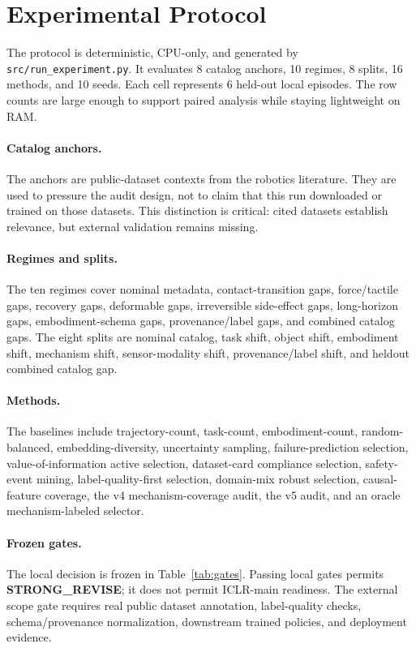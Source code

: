 \documentclass{article}
\begin{document}
\section{Experimental Protocol}
The protocol is deterministic, CPU-only, and generated by \texttt{src/run\_experiment.py}. It evaluates 8 catalog anchors, 10 regimes, 8 splits, 16 methods, and 10 seeds. Each cell represents 6 held-out local episodes. The row counts are large enough to support paired analysis while staying lightweight on RAM.



\paragraph{Catalog anchors.}
The anchors are public-dataset contexts from the robotics literature. They are used to pressure the audit design, not to claim that this run downloaded or trained on those datasets. This distinction is critical: cited datasets establish relevance, but external validation remains missing.

\paragraph{Regimes and splits.}
The ten regimes cover nominal metadata, contact-transition gaps, force/tactile gaps, recovery gaps, deformable gaps, irreversible side-effect gaps, long-horizon gaps, embodiment-schema gaps, provenance/label gaps, and combined catalog gaps. The eight splits are nominal catalog, task shift, object shift, embodiment shift, mechanism shift, sensor-modality shift, provenance/label shift, and heldout combined catalog gap.

\paragraph{Methods.}
The baselines include trajectory-count, task-count, embodiment-count, random-balanced, embedding-diversity, uncertainty sampling, failure-prediction selection, value-of-information active selection, dataset-card compliance selection, safety-event mining, label-quality-first selection, domain-mix robust selection, causal-feature coverage, the v4 mechanism-coverage audit, the v5 audit, and an oracle mechanism-labeled selector.

\paragraph{Frozen gates.}
The local decision is frozen in Table~\ref{tab:gates}. Passing local gates permits \textbf{STRONG\_REVISE}; it does not permit ICLR-main readiness. The external scope gate requires real public dataset annotation, label-quality checks, schema/provenance normalization, downstream trained policies, and deployment evidence.
\end{document}
